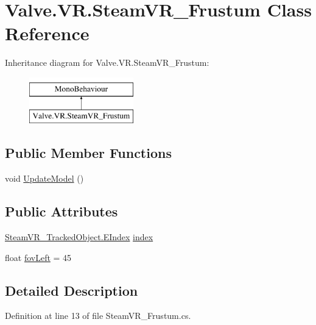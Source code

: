 \hypertarget{class_valve_1_1_v_r_1_1_steam_v_r___frustum}{}\section{Valve.\+V\+R.\+Steam\+V\+R\+\_\+\+Frustum Class Reference}
\label{class_valve_1_1_v_r_1_1_steam_v_r___frustum}
Inheritance diagram for Valve.\+V\+R.\+Steam\+V\+R\+\_\+\+Frustum\+:\begin{figure}[H]
\begin{center}
\leavevmode
\includegraphics[height=2.000000cm]{class_valve_1_1_v_r_1_1_steam_v_r___frustum}
\end{center}
\end{figure}
\subsection*{Public Member Functions}
\begin{DoxyCompactItemize}
\item 
void \mbox{\hyperlink{class_valve_1_1_v_r_1_1_steam_v_r___frustum_a45fe8f25b1a144161ceed2be954d7c51}{Update\+Model}} ()
\end{DoxyCompactItemize}
\subsection*{Public Attributes}
\begin{DoxyCompactItemize}
\item 
\mbox{\hyperlink{class_valve_1_1_v_r_1_1_steam_v_r___tracked_object_a3d437894eff0bfc81eeb21a8c478413e}{Steam\+V\+R\+\_\+\+Tracked\+Object.\+E\+Index}} \mbox{\hyperlink{class_valve_1_1_v_r_1_1_steam_v_r___frustum_a35a0d2ed241873ce3cb09bec06fb4030}{index}}
\item 
float \mbox{\hyperlink{class_valve_1_1_v_r_1_1_steam_v_r___frustum_a63c61c875985f507d1ee3fe901fe83c1}{fov\+Left}} = 45
\end{DoxyCompactItemize}


\subsection{Detailed Description}


Definition at line 13 of file Steam\+V\+R\+\_\+\+Frustum.\+cs.



